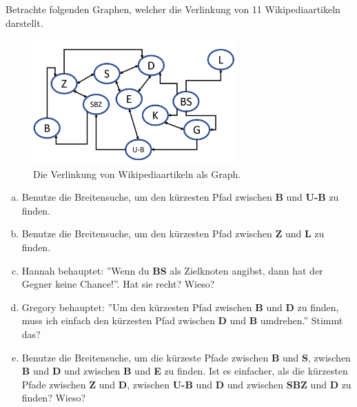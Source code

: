 \begin{aufgabe}\label{wikipedia_kontrollaufgabe}
Betrachte folgenden Graphen, welcher die Verlinkung von 11 Wikipediaartikeln darstellt.
\begin{figure}[H]
    \centering
    \includegraphics[width=0.7\textwidth]{Pictures/Wikipedia.PNG} 
    \caption{Die Verlinkung von Wikipediaartikeln als Graph.}
\end{figure}
\begin{enumerate}[(a)]
\item Benutze die Breitensuche, um den kürzesten Pfad zwischen \textbf{B} und \textbf{U-B} zu finden.
\item Benutze die Breitensuche, um den kürzesten Pfad zwischen \textbf{Z} und \textbf{L} zu finden.
\item Hannah behauptet: ''Wenn du \textbf{BS} als Zielknoten angibst, dann hat der Gegner keine Chance!''. Hat sie recht? Wieso?
\item Gregory behauptet: ''Um den kürzesten Pfad zwischen \textbf{B} und \textbf{D} zu finden, muss ich einfach den kürzesten Pfad zwischen \textbf{D} und \textbf{B} umdrehen.'' Stimmt das?
\item Benutze die Breitensuche, um die kürzeste Pfade zwischen \textbf{B} und \textbf{S}, zwischen \textbf{B} und \textbf{D} und zwischen \textbf{B} und \textbf{E} zu finden. Ist es einfacher, als die kürzesten Pfade zwischen \textbf{Z} und \textbf{D}, zwischen \textbf{U-B} und \textbf{D} und zwischen \textbf{SBZ} und \textbf{D} zu finden? Wieso?
\end{enumerate}
\end{aufgabe}

